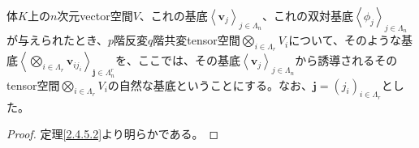 \documentclass[dvipdfmx]{jsarticle}
\begin{document}
\begin{dfn}
体$K$上の$n$次元vector空間$V$、これの基底$\left\langle \mathbf{v}_{j} \right\rangle_{j \in \varLambda_{n}}$、これの双対基底$\left\langle \phi_{j} \right\rangle_{j \in \varLambda_{n}}$が与えられたとき、$p$階反変$q$階共変tensor空間$\bigotimes_{i \in \varLambda_{r}} V_{i}$について、そのような基底$\left\langle \bigotimes_{i \in \varLambda_{r}} \mathbf{v}_{ij_{i}} \right\rangle_{\mathbf{j} \in \varLambda_{n}^{r}}$を、ここでは、その基底$\left\langle \mathbf{v}_{j} \right\rangle_{j \in \varLambda_{n}}$から誘導されるそのtensor空間$\bigotimes_{i \in \varLambda_{r}} V_{i}$の自然な基底ということにする。なお、$\mathbf{j}=\left( j_{i} \right)_{i \in \varLambda_{r}}$とした。
\end{dfn}
\begin{proof} 定理\ref{2.4.5.2}より明らかである。
\end{proof}
\end{document}
